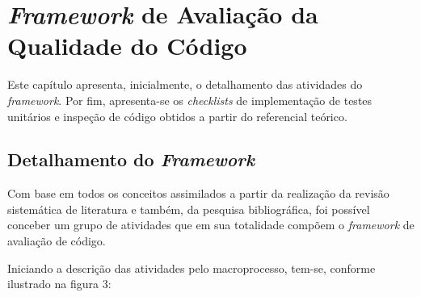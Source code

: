 \chapter{\textit{Framework} de Avaliação da Qualidade do Código}

Este capítulo apresenta, inicialmente, o detalhamento das atividades do \textit{framework}. Por fim, apresenta-se os \textit{checklists} de implementação de testes unitários e inspeção de código obtidos a partir do referencial teórico.

\section{Detalhamento do \textit{Framework}}

Com base em todos os conceitos assimilados a partir da realização da revisão sistemática de literatura e também, da pesquisa bibliográfica, foi possível conceber um grupo de atividades que em sua totalidade compõem o \textit{framework} de avaliação de código.

Iniciando a descrição das atividades pelo macroprocesso, tem-se, conforme ilustrado na figura 3:


